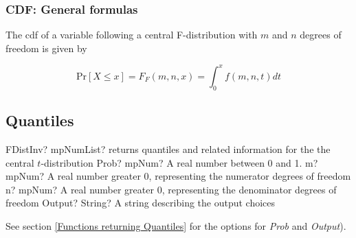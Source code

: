 \subsubsection{CDF: General formulas}
\label{FDistributionCDF}
The cdf of a variable following a central  F-distribution with $m$ and $n$ degrees of freedom is given by

\begin{equation}
	\text{Pr}\left[X \le x\right] = F_F\left(m,n,x\right) =  \int_{0}^{x} f(m,n,t) dt
\end{equation}




\subsection{Quantiles}
\label{FDistributionQuantiles}


\begin{mpFunctionsExtract}
	\mpFunctionThree
	{FDistInv? mpNumList? returns quantiles and related information for the the central $t$-distribution}
	{Prob? mpNum? A real number between 0 and 1.}
	{m? mpNum? A real number greater 0, representing the numerator  degrees of freedom}
	{n? mpNum? A real number greater 0, representing the denominator degrees of freedom}
	{Output? String? A string describing the output choices}
\end{mpFunctionsExtract}

See section \ref{Functions returning Quantiles} for the options for  {\itshape\sffamily Prob} and {\itshape\sffamily Output}). 

%
%
%

